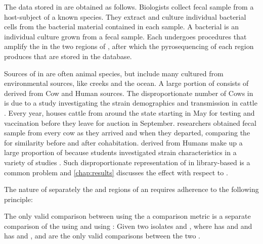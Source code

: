 The data stored in \cplop{} are obtained as follows.
Biologists collect fecal sample from a host-subject of a known species.
They extract \ecoli{} and culture individual bacterial cells from the bacterial material contained in each sample.
A bacterial \textit{\isol{}} is an individual culture grown from a fecal sample.
\index{\isol{}}
Each \isol{} undergoes \pcr{} procedures that amplify the \dna{} in the two \itsshort{} regions of \dna{}, after which the pyrosequencing of each region produces \pyros{} that are stored in the \cplop{} database.

Sources of \isols{} in \cplop{} are often animal species, but include many \isols{} cultured from environmental sources, like creeks and the ocean.
A large portion of \cplop{} consists of \isols{} derived from Cow and Human sources.
The disproportionate number of Cows in \cplop{} is due to a study investigating the strain demographics and transmission in cattle \cite{dillard2013coli, dillard2015demographics}.
Every year, \cp{} houses cattle from around the state starting in May for testing and vaccination before they leave for auction in September.
\cp{} researchers obtained fecal sample from every cow as they arrived and when they departed, comparing the \isols{} for similarity before and after cohabitation.
\Isols{} derived from Humans make up a large proportion of \cplop{} because \cp{} students investigated \ecoli{} strain characteristics in a variety of studies \cite{neal2013escherichia, montana2012investigating, neal2012demographics}.
Such disproportionate representation of \spec{} in library-based \mst{} is a common problem and \autoref{chap:results} discusses the effect with respect to \cplop{}.

The nature of separately \pyroing{} the \Ssixt{} and \Sfive{} regions of an \isol{} requires adherence to the following principle:

\begin{principle}\label{principle:comparing-isolates}
The only valid comparison between \isols{} using the a comparison metric \pcfunclabel{} is a separate comparison of the \Ssixt{} \pyros{} using \pcfunclabel{} and \Sfive{} \pyros{} using \pcfunclabel{}:
Given two isolates \isola{} and \isolb{}, where 
\isola{} has \pyros{} \isolasixt{} and \isolafive{}
and
\isolb{} has \pyros{} \isolbsixt{} and \isolbfive{},
\pcisolsixt{}
and
\pcisolfive{}
are the only valid comparisons between the two \isols{}.
\end{principle}
\index{\pearson{}}
\index{\pcfunclabel{}}

